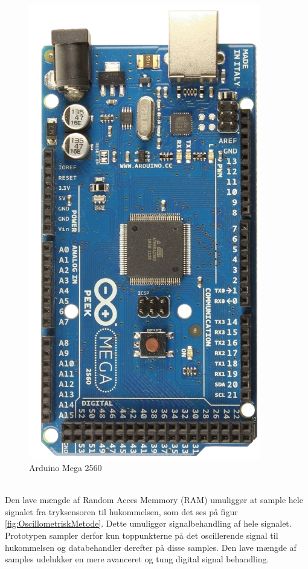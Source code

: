\begin{minipage}[t]{0.4\textwidth}
	\begin{figure}[H]
		\centering
		\includegraphics[width = 0.9\textwidth]{billeder/arduinoMega2560.png}
		\caption{Arduino Mega 2560}\label{fig:arduinoMega2560}
	\end{figure}
\end{minipage}\\

Den lave mængde af Random Acces Memmory (RAM) umuliggør at sample hele signalet fra tryksensoren til hukommelsen, som det ses på figur \ref{fig:OscillometriskMetode}. Dette umuliggør signalbehandling af hele signalet. Prototypen sampler derfor kun toppunkterne på det oscillerende signal til hukommelsen og databehandler derefter på disse samples. Den lave mængde af samples udelukker en mere avanceret og tung digital signal behandling.

